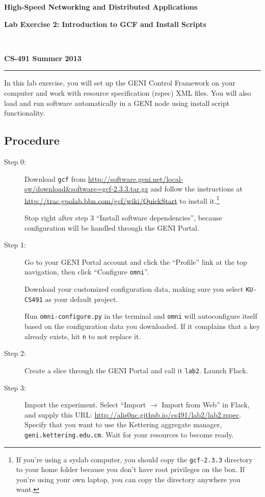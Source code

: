 \documentclass[12pt,letterpaper]{article}
\makeatletter
\newcommand*{\textoverline}[1]{$\overline{\hbox{#1}}\m@th$}
\newcommand*{\fitb}[2]
{\raisebox{-1.3ex}{\textoverline{{\makebox[#1]{{\rule{0pt}{5pt}\tiny #2}}}}}}
\makeatother
\begin{document}
\raggedright
\centerline{\textbf{High-Speed Networking and Distributed Applications}}
\centerline{\textbf{Lab Exercise 2: Introduction to GCF and Install Scripts}}
~\\
\centerline{\textbf{CS-491 \hfill Summer 2013}}
\noindent\rule{\textwidth}{1pt}

\bigskip
In this lab exercise, you will set up the GENI Control Framework on your 
computer and work with resource specification (rspec) XML files. You will also 
load and run software automatically in a GENI node using install 
script functionality.


\subsection*{Procedure}

\begin{description}

\item[Step 0:]
Download \texttt{gcf} from  
\url{http://software.geni.net/local-sw/download&software=gcf-2.3.3.tar.gz} 
and follow the instructions at 
\url{http://trac.gpolab.bbn.com/gcf/wiki/QuickStart} to install it.\footnote
    {If you're using a syslab computer, you should copy the 
    \texttt{gcf-2.3.3} directory to your home folder because you don't have 
    root privileges on the box. If you're using your own laptop, you can copy 
    the directory anywhere you want.}
    
Stop right after step 3 ``Install software dependencies'', because 
configuration will be handled through the GENI Portal.

\item[Step 1:]
Go to your GENI Portal account and click the ``Profile'' link at the top 
navigation, then click ``Configure \texttt{omni}''. 

Download your customized configuration data, making sure you select 
\texttt{KU-CS491} as your default project.

Run \texttt{omni-configure.py}
in the terminal and \texttt{omni} will autoconfigure itself based on the 
configuration data you downloaded. If it complains that a key already exists, 
hit \texttt{n} to not replace it.

\item[Step 2:]
Create a slice through the GENI Portal and call it 
\texttt{\fitb{1in}{username}lab2}. Launch Flack.

\item[Step 3:]
Import the experiment. Select ``Import $\rightarrow$ Import from Web'' in
Flack, and supply this URL: 
\url{http://alis0nc.github.io/cs491/lab2/lab2.rspec}.
Specify that you want to use the Kettering aggregate manager, 
\texttt{geni.kettering.edu.cm}. Wait for your resources to become ready.


\end{description}
\end{document}

